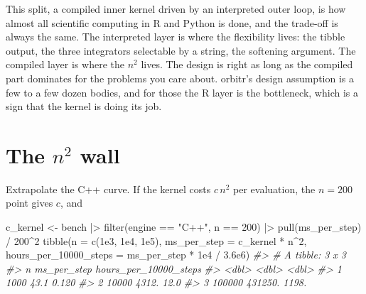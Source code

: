 \documentclass[
  10.5pt,
  letterpaper,
]{scrbook}
\newenvironment{Shaded}{\begin{snugshade}}{\end{snugshade}}
\newcommand{\AttributeTok}[1]{\textcolor[rgb]{0.00,0.00,0.00}{#1}}
\newcommand{\CommentTok}[1]{\textcolor[rgb]{0.00,0.00,0.00}{\textit{#1}}}
\newcommand{\DecValTok}[1]{\textcolor[rgb]{0.00,0.00,0.00}{#1}}
\newcommand{\FloatTok}[1]{\textcolor[rgb]{0.00,0.00,0.00}{#1}}
\newcommand{\FunctionTok}[1]{\textcolor[rgb]{0.00,0.00,0.00}{#1}}
\newcommand{\NormalTok}[1]{\textcolor[rgb]{0.00,0.00,0.00}{#1}}
\newcommand{\OtherTok}[1]{\textcolor[rgb]{0.00,0.00,0.00}{#1}}
\newcommand{\SpecialCharTok}[1]{\textcolor[rgb]{0.00,0.00,0.00}{#1}}
\newcommand{\StringTok}[1]{\textcolor[rgb]{0.00,0.00,0.00}{#1}}
\theoremstyle{plain}
\theoremstyle{remark}
\begin{document}
\begin{tcolorbox}[enhanced jigsaw, arc=.35mm, bottomrule=.15mm, bottomtitle=1mm, breakable, colback=white, colbacktitle=quarto-callout-note-color!10!white, colframe=quarto-callout-note-color-frame, coltitle=black, left=2mm, leftrule=.75mm, opacityback=0, opacitybacktitle=0.6, rightrule=.15mm, title={Where it comes from}, titlerule=0mm, toprule=.15mm, toptitle=1mm]

This split, a compiled inner kernel driven by an interpreted outer loop,
is how almost all scientific computing in R and Python is done, and the
trade-off is always the same. The interpreted layer is where the
flexibility lives: the tibble output, the three integrators selectable
by a string, the softening argument. The compiled layer is where the
\(n^2\) lives. The design is right as long as the compiled part
dominates for the problems you care about. orbitr's design assumption is
a few to a few dozen bodies, and for those the R layer is the
bottleneck, which is a sign that the kernel is doing its job.

\end{tcolorbox}

\section{\texorpdfstring{The \(n^2\)
wall}{The n\^{}2 wall}}\label{the-n2-wall}

Extrapolate the C++ curve. If the kernel costs \(c\,n^2\) per
evaluation, the \(n = 200\) point gives \(c\), and

\begin{Shaded}
\begin{Highlighting}[]
\NormalTok{c\_kernel }\OtherTok{\textless{}{-}}\NormalTok{ bench }\SpecialCharTok{|\textgreater{}} \FunctionTok{filter}\NormalTok{(engine }\SpecialCharTok{==} \StringTok{"C++"}\NormalTok{, n }\SpecialCharTok{==} \DecValTok{200}\NormalTok{) }\SpecialCharTok{|\textgreater{}} \FunctionTok{pull}\NormalTok{(ms\_per\_step) }\SpecialCharTok{/} \DecValTok{200}\SpecialCharTok{\^{}}\DecValTok{2}
\FunctionTok{tibble}\NormalTok{(}\AttributeTok{n =} \FunctionTok{c}\NormalTok{(}\FloatTok{1e3}\NormalTok{, }\FloatTok{1e4}\NormalTok{, }\FloatTok{1e5}\NormalTok{),}
       \AttributeTok{ms\_per\_step =}\NormalTok{ c\_kernel }\SpecialCharTok{*}\NormalTok{ n}\SpecialCharTok{\^{}}\DecValTok{2}\NormalTok{,}
       \AttributeTok{hours\_per\_10000\_steps =}\NormalTok{ ms\_per\_step }\SpecialCharTok{*} \FloatTok{1e4} \SpecialCharTok{/} \FloatTok{3.6e6}\NormalTok{)}
\CommentTok{\#\textgreater{} \# A tibble: 3 x 3}
\CommentTok{\#\textgreater{}        n ms\_per\_step hours\_per\_10000\_steps}
\CommentTok{\#\textgreater{}    \textless{}dbl\textgreater{}       \textless{}dbl\textgreater{}                 \textless{}dbl\textgreater{}}
\CommentTok{\#\textgreater{} 1   1000        43.1                 0.120}
\CommentTok{\#\textgreater{} 2  10000      4312.                 12.0  }
\CommentTok{\#\textgreater{} 3 100000    431250.               1198.}
\end{Highlighting}
\end{Shaded}
\end{document}
